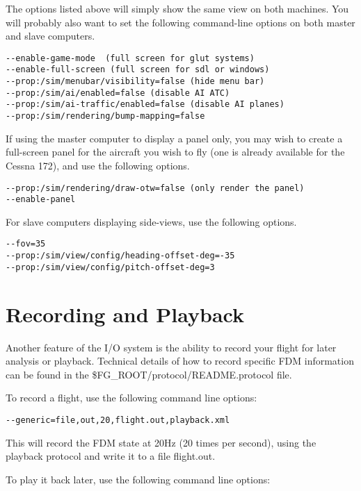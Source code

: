 The options listed above will simply show the same view on both machines. You will probably also want to set the
following command-line options on both master and slave computers.

\begin{verbatim}
--enable-game-mode  (full screen for glut systems)
--enable-full-screen (full screen for sdl or windows)
--prop:/sim/menubar/visibility=false (hide menu bar)
--prop:/sim/ai/enabled=false (disable AI ATC)
--prop:/sim/ai-traffic/enabled=false (disable AI planes)
--prop:/sim/rendering/bump-mapping=false
\end{verbatim}

If using the master computer to display a panel only, you may wish to create a full-screen panel for the
aircraft you wish to fly (one is already available for the Cessna 172), and use the following options.

\begin{verbatim}
--prop:/sim/rendering/draw-otw=false (only render the panel)
--enable-panel
\end{verbatim}

For slave computers displaying side-views, use the following options.

\begin{verbatim}
--fov=35
--prop:/sim/view/config/heading-offset-deg=-35
--prop:/sim/view/config/pitch-offset-deg=3
\end{verbatim}

\section{Recording and Playback}

Another feature of the I/O system is the ability to record your flight for
later analysis or playback. Technical details of how to record specific FDM
information can be found in the \$FG\_ROOT/protocol/README.protocol file.

To record a flight, use the following command line options:

\begin{verbatim}
--generic=file,out,20,flight.out,playback.xml
\end{verbatim}

This will record the FDM state at 20Hz (20 times per second), using the playback
protocol and write it to a file flight.out.

To play it back later, use the following command line options:

